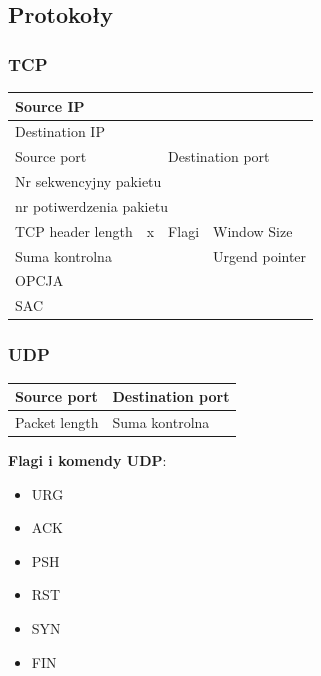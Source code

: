 \documentclass[a4paper,twoside]{article}
\begin{document}
\subsection{Protokoły}
\subsubsection{TCP}
\begin{table}[h]
	\begin{tabular}{|c|c|c|c|c|}
		\hline
		\multicolumn{5}{|l|}{Source IP}                 \\ \hline
		\multicolumn{5}{|l|}{Destination IP}                 \\ \hline
		\multicolumn{2}{|l|}{Source port} & \multicolumn{3}{l|}{Destination port}                \\ \hline
		\multicolumn{5}{|l|}{Nr sekwencyjny pakietu}                                             \\ \hline
		\multicolumn{5}{|l|}{nr potiwerdzenia pakietu}                                           \\ \hline
		TCP header length       & x       & Flagi          & \multicolumn{2}{l|}{Window Size}    \\ \hline
		\multicolumn{3}{|l|}{Suma kontrolna}               & \multicolumn{2}{l|}{Urgend pointer} \\ \hline
		\multicolumn{5}{|l|}{OPCJA}  \\ \hline
		\multicolumn{5}{|l|}{SAC}  \\ \hline
	\end{tabular}
\end{table}

\subsubsection{UDP}
\begin{table}[h]
	\begin{tabular}{|l|l|l|l|l|}
		\hline
		\multicolumn{2}{|l|}{Source port}   & \multicolumn{3}{l|}{Destination port} \\ \hline
		\multicolumn{2}{|l|}{Packet length} & \multicolumn{3}{l|}{Suma kontrolna}   \\ \hline
	\end{tabular}
\end{table}

\textbf{Flagi i komendy UDP}:
\begin{itemize}
	\item URG
	\item ACK
	\item PSH
	\item RST
	\item SYN
	\item FIN
\end{itemize}
\end{document}
